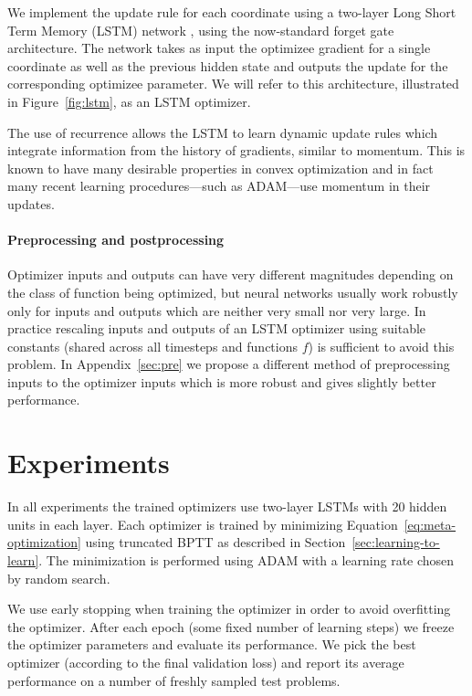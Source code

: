 \documentclass{article}
\begin{document}
We implement the update rule for each coordinate using a two-layer Long Short
Term Memory (LSTM) network \citep{hochreiter:1997}, using the now-standard
forget gate architecture. The network takes as input the optimizee gradient for
a single coordinate as well as the previous hidden state and outputs the update
for the corresponding optimizee parameter. We will refer to this architecture,
illustrated in Figure~\ref{fig:lstm}, as an LSTM optimizer.

The use of recurrence allows the LSTM to learn dynamic update rules which
integrate information from the history of gradients, similar to momentum. This
is known to have many desirable properties in convex optimization
\citep[see e.g.][]{nesterov:1983} and in fact many recent learning
procedures---such as ADAM---use momentum in their updates.

\paragraph{Preprocessing and postprocessing}

Optimizer inputs and outputs can have very different magnitudes depending on
the class of function being optimized, but neural networks usually work
robustly only for inputs and outputs which are neither very small nor very
large. In practice rescaling inputs and outputs of an LSTM optimizer using
suitable constants (shared across all timesteps and functions $f$) is
sufficient to avoid this problem. In Appendix~\ref{sec:pre} we propose a
different method of preprocessing inputs to the optimizer inputs which is more
robust and gives slightly better performance.

\section{Experiments}\label{sec:exp}

In all experiments the trained optimizers use two-layer LSTMs with 20 hidden
units in each layer. Each optimizer is trained by minimizing
Equation~\ref{eq:meta-optimization} using truncated BPTT as described in
Section~\ref{sec:learning-to-learn}. The minimization is performed using ADAM
with a learning rate chosen by random search.

We use early stopping when training the optimizer in order to avoid overfitting
the optimizer.  After each epoch (some fixed number of learning steps) we
freeze the optimizer parameters and evaluate its performance.  We pick the best
optimizer (according to the final validation loss) and report its average
performance on a number of freshly sampled test problems.
\end{document}
